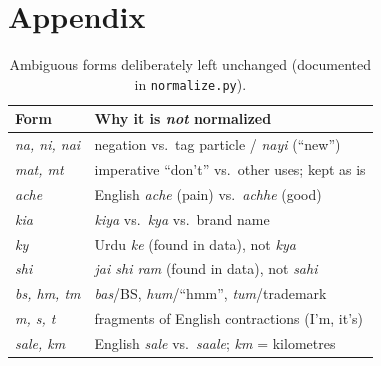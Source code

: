 \documentclass[10pt,twocolumn,letterpaper]{article}
\begin{document}
\section{Appendix}
\begin{table}[h]\centering\footnotesize\setlength{\tabcolsep}{4pt}

\caption{Repository commit history (hash, timestamp, message), generated by \texttt{src/commit\_log.py}.}\label{tab:commits}
\end{table}
\begin{table}[h]\centering\footnotesize\setlength{\tabcolsep}{4pt}

\caption{Audit statistics (all numbers from \texttt{results/audit.json}).}\label{tab:audit}
\end{table}
\begin{table}[h]\centering\footnotesize\setlength{\tabcolsep}{4pt}
\begin{tabular}{@{}lp{5.6cm}@{}}
\toprule
Form & Why it is \emph{not} normalized\\
\midrule
\emph{na, ni, nai} & negation vs.\ tag particle / \emph{nayi} (``new'')\\
\emph{mat, mt} & imperative ``don't'' vs.\ other uses; kept as is\\
\emph{ache} & English \emph{ache} (pain) vs.\ \emph{achhe} (good)\\
\emph{kia} & \emph{kiya} vs.\ \emph{kya} vs.\ brand name\\
\emph{ky} & Urdu \emph{ke} (found in data), not \emph{kya}\\
\emph{shi} & \emph{jai shi ram} (found in data), not \emph{sahi}\\
\emph{bs, hm, tm} & \emph{bas}/BS, \emph{hum}/``hmm'', \emph{tum}/trademark\\
\emph{m, s, t} & fragments of English contractions (I'm, it's)\\
\emph{sale, km} & English \emph{sale} vs.\ \emph{saale}; \emph{km} = kilometres\\
\bottomrule
\end{tabular}
\caption{Ambiguous forms deliberately left unchanged (documented in \texttt{normalize.py}).}\label{tab:excl}
\end{table}
\begin{table}[h]\centering\footnotesize\setlength{\tabcolsep}{4pt}

\caption{Most frequent normalization rules (frequency over all splits). Full list: \texttt{results/rule\_audit.csv}.}\label{tab:rules}
\end{table}
\begin{table}[h]\centering\footnotesize

\caption{Examples of generated variants (A: attested swap; B: synthetic noise, $p{=}0.3$).}\label{tab:variants}
\end{table}
\label{app:var}
\end{document}
